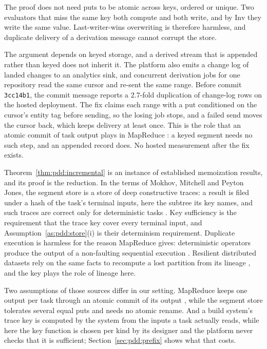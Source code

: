 \documentclass[11pt,letterpaper]{article}
\theoremstyle{definition}
\theoremstyle{remark}
\DeclareRobustCommand{\code}[1]{{\def\_{\textunderscore\allowbreak}\texttt{#1}}}
\begin{document}
The proof does not need puts to be atomic across keys, ordered or unique. Two evaluators that miss the same key both compute and both write, and by $\mathrm{Inv}$ they write the same value. Last-writer-wins overwriting is therefore harmless, and duplicate delivery of a derivation message cannot corrupt the store.

The argument depends on keyed storage, and a derived stream that is appended rather than keyed does not inherit it. The platform also emits a change log of landed changes to an analytics sink, and concurrent derivation jobs for one repository read the same cursor and re-sent the same range. Before commit \code{3cc14b1}, the commit message reports a 2.7-fold duplication of change-log rows on the hosted deployment. %
The fix claims each range with a put conditioned on the cursor's entity tag before sending, so the losing job stops, and a failed send moves the cursor back, which keeps delivery at least once. This is the role that an atomic commit of task output plays in MapReduce \cite[Section~3.3]{dean2004mapreduce}: a keyed segment needs no such step, and an appended record does. No hosted measurement after the fix exists.

Theorem~\ref{thm:pdd:incremental} is an instance of established memoization results, and its proof is the reduction. In the terms of Mokhov, Mitchell and Peyton Jones, the segment store is a store of deep constructive traces: a result is filed under a hash of the task's terminal inputs, here the subtree its key names, and such traces are correct only for deterministic tasks \cite[Section~4.2.4]{mokhov2018build}. Key sufficiency is the requirement that the trace key cover every terminal input, and Assumption~\ref{as:pdd:store}(i) is their determinism requirement. Duplicate execution is harmless for the reason MapReduce gives: deterministic operators produce the output of a non-faulting sequential execution \cite[Section~3.3]{dean2004mapreduce}. Resilient distributed datasets rely on the same facts to recompute a lost partition from its lineage \cite[Sections~1 and~2.1]{zaharia2012rdd}, and the key plays the role of lineage here.

Two assumptions of those sources differ in our setting. MapReduce keeps one output per task through an atomic commit of its output \cite[Section~3.3]{dean2004mapreduce}, while the segment store tolerates several equal puts and needs no atomic rename. And a build system's trace key is computed by the system from the inputs a task actually reads, while here the key function is chosen per kind by its designer and the platform never checks that it is sufficient; Section~\ref{sec:pdd:prefix} shows what that costs.
\end{document}
